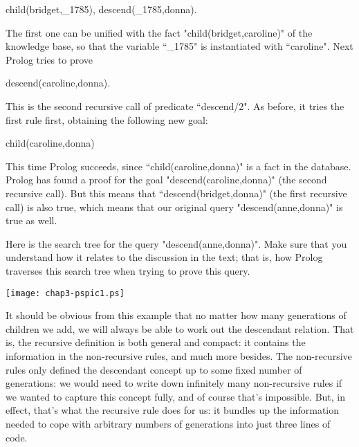 \begin{LPNcodedisplay}
child(bridget,_1785),
descend(_1785,donna).
\end{LPNcodedisplay}


The first one can be unified with the fact
"child(bridget,caroline)" of the knowledge base, so that the
variable ``\_1785" is instantiated with ``caroline". Next Prolog
tries to prove

\begin{LPNcodedisplay}
descend(caroline,donna).
\end{LPNcodedisplay}
This is the second recursive call of predicate ``descend/2".
As before, it tries the first rule first, obtaining the following new
goal:

\begin{LPNcodedisplay}
child(caroline,donna)
\end{LPNcodedisplay}


This time Prolog succeeds, since ``child(caroline,donna)" is a
fact in the database. Prolog has found a proof for the goal
"descend(caroline,donna)" (the second recursive call). But this
means that ``descend(bridget,donna)" (the first recursive call)
is also true, which means that our original query
"descend(anne,donna)" is true as well.

Here is the search tree for the query
"descend(anne,donna)". Make sure that you understand how it
relates to the discussion in the text; that is, how Prolog
traverses this search tree when trying to prove this query.

\begin{center}
\texttt{[image: chap3-pspic1.ps]}
\end{center}

\bigskip
\bigskip
\bigskip
\medskip

It should be obvious from this example that no matter how many
generations of children we add, we will always be able to work out the
descendant relation. That is, the recursive definition is both general
and compact: it contains  the information in the
non-recursive rules, and much more besides.  The non-recursive rules
only defined the descendant concept up to some fixed number of
generations: we would need to write down infinitely many non-recursive
rules if we wanted to capture this concept fully, and of course that's
impossible.  But, in effect, that's what the recursive rule does for
us: it bundles up the information needed to cope with arbitrary
numbers of generations into just three lines of code.

